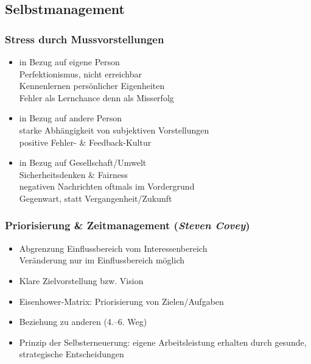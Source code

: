 \documentclass{cheatsheet}
\begin{document}
    \subsection{Selbstmanagement}
    \begin{normbox}{\subsubsection{Stress durch Mussvorstellungen}}
        \begin{itemize}
            \item in Bezug auf eigene Person\\
            \ra Perfektionismus, nicht erreichbar\\
            \ra Kennenlernen persönlicher Eigenheiten\\
            \ra Fehler als Lernchance denn als Misserfolg
            \item in Bezug auf andere Person\\
            \ra starke Abhängigkeit von subjektiven Vorstellungen\\
            \ra positive Fehler- \& Feedback-Kultur
            \item in Bezug auf Gesellschaft/Umwelt\\
            \ra Sicherheitsdenken \& Fairness\\
            \ra negativen Nachrichten oftmals im Vordergrund\\
            \ra Gegenwart, statt Vergangenheit/Zukunft
        \end{itemize}
    \end{normbox}
    \begin{normbox}{\subsubsection{Priorisierung \& Zeitmanagement (\emph{Steven Covey})}}
        \begin{itemize}
            \item Abgrenzung Einflussbereich vom Interessenbereich\\
            \ra Veränderung nur im Einflussbereich möglich
            \item Klare Zielvorstellung bzw. Vision
            \item Eisenhower-Matrix: Priorisierung von Zielen/Aufgaben\\
            \item Beziehung zu anderen (4.–6. Weg)
            \item Prinzip der Selbsterneuerung: eigene Arbeitsleistung erhalten durch gesunde, strategische Entscheidungen
        \end{itemize}
    \end{normbox}
\end{document}
